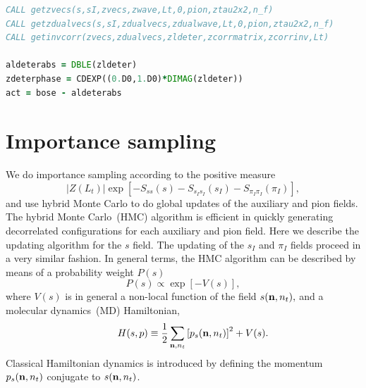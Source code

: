 \begin{lstlisting}[language=Fortran,caption=Sample code where transfer matrix product multiplications are called and used to compute the determinant and inverse of the matrix of single-nucleon
amplitudes.,label={label_3}]
CALL getzvecs(s,sI,zvecs,zwave,Lt,0,pion,ztau2x2,n_f)            
CALL getzdualvecs(s,sI,zdualvecs,zdualwave,Lt,0,pion,ztau2x2,n_f)
CALL getinvcorr(zvecs,zdualvecs,zldeter,zcorrmatrix,zcorrinv,Lt)

aldeterabs = DBLE(zldeter)
zdeterphase = CDEXP((0.D0,1.D0)*DIMAG(zldeter))
act = bose - aldeterabs
\end{lstlisting}

\section{Importance sampling}

We do importance sampling according to the positive measure 
\begin{equation}
|Z(L_t)|\exp{\left[-S_{ss}(s)
-S_{s_Is_I}(s_I)
-S_{\pi_I\pi_I}(\pi_I)\right]},
\end{equation} 
and use hybrid Monte Carlo to do global updates of the auxiliary and pion
fields. The hybrid Monte Carlo~(HMC) algorithm
\cite{Scalettar:1986uy,Gottlieb:1987mq,Duane:1987de} is efficient in quickly generating decorrelated configurations for
each
auxiliary and pion field.  Here we describe the
updating algorithm for the $s$ field. The updating of the $s_I$ and $\pi_I$
fields proceed in a very similar fashion.  In
general terms, the HMC algorithm can be described by means of a probability
weight $P(s)$
\begin{equation}
P(s)\propto\exp[-V(s)],
\end{equation}
where $V(s)$ is in general a non-local function of the field $s({{\bf n}%
,n_t}),$ and a molecular dynamics~(MD) Hamiltonian,
\begin{equation}
\quad\quad H(s,p)\equiv\frac{1}{2}\sum_{{\bf n},n_t%
}\left[p_s({{\bf n},n_t})\right]  ^{2}+V(s).
\end{equation}
Classical Hamiltonian dynamics is introduced by defining
the
momentum $p_s({{\bf n},n_t})$ conjugate to $s({{\bf n},n_t})$.

